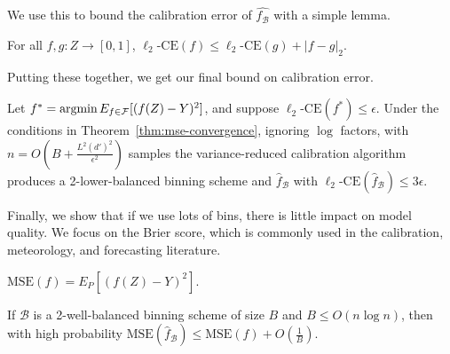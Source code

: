 We use this to bound the calibration error of $\hat{f_{\mathcal{B}}}$ with a simple lemma.

\begin{lemma}
For all $f, g : Z \to [0, 1]$, $\ell_2\mbox{-CE}(f) \leq \ell_2\mbox{-CE}(g) + |f - g|_2$.
\end{lemma}

Putting these together, we get our final bound on calibration error.

\begin{theorem}
\label{thm:final-calib}
Let $f^* = \mathop{\mbox{argmin}}{E_{f \in \mathcal{F}}[(f(Z) - Y)^2]}$, and suppose $\ell_2\mbox{-CE}(f^*) \leq \epsilon$. Under the conditions in Theorem~\ref{thm:mse-convergence}, ignoring $\log$ factors, with $n = O(B + \frac{L^2 (d')^2}{\epsilon^2})$ samples the variance-reduced calibration algorithm produces a 2-lower-balanced binning scheme and $\hat{f}_{\mathcal{B}}$ with $\ell_2\mbox{-CE}(\hat{f}_{\mathcal{B}}) \leq 3 \epsilon$.
\end{theorem}

Finally, we show that if we use lots of bins, there is little impact on model quality. We focus on the Brier score, which is commonly used in the calibration, meteorology, and forecasting literature.

\begin{definition}
$\mbox{MSE}(f) = E_P[(f(Z) - Y)^2]$. 
\end{definition}

\begin{theorem}
\label{thm:sharpness-bound}
If $\mathcal{B}$ is a 2-well-balanced binning scheme of size $B$ and $B \leq O(n\log{n})$, then with high probability $\mbox{MSE}(\hat{f}_{\mathcal{B}}) \leq \mbox{MSE}(f) + O(\frac{1}{B})$.
\end{theorem}
